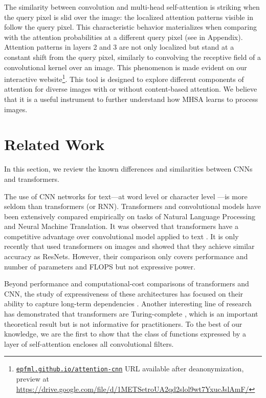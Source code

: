 \documentclass{article} \usepackage{iclr2020_conference,times}
\newcommand{\interactiveurl}{\href{https://epfml.github.io/attention-cnn}{\tt epfml.github.io/attention-cnn}}
\begin{document}
The similarity between convolution and multi-head self-attention is striking when the query pixel is slid over the image:
the localized attention patterns visible in  follow the query pixel.
This characteristic behavior materializes when comparing  with the attention probabilities at a different query pixel (see  in Appendix).
Attention patterns in layers 2 and 3 are not only localized but stand at a constant shift from the query pixel, similarly to convolving the receptive field of a convolutional kernel over an image.
This phenomenon is made evident on our interactive website\footnote{\ificlrfinal \interactiveurl{} \else URL available after deanonymization, preview at \url{https://drive.google.com/file/d/1METSetroUA2qd2slol9wt7YxucJslAmF/} \fi}.
This tool is designed to explore different components of attention for diverse images with or without content-based attention.
We believe that it is a useful instrument to further understand how MHSA learns to process images.

\section{Related Work}

In this section, we review the known differences and similarities between CNNs and transformers.



The use of CNN networks for text---at word level \citep{DBLP:journals/corr/GehringAGYD17} or character level \citep{kim-2014-convolutional}---is more seldom than transformers (or RNN).
Transformers and convolutional models have been extensively compared empirically on tasks of Natural Language Processing and Neural Machine Translation.
It was observed that transformers have a competitive advantage over convolutional model applied to text \citep{vaswani17attentionisallyouneed}.
It is only recently that \cite{belloAttentionAugmentedConvolutional2019,ramachandran2019standaloneselfattention} used transformers on images and showed that they achieve similar accuracy as ResNets.
However, their comparison only covers performance and number of parameters and FLOPS but not expressive power.



Beyond performance and computational-cost comparisons of transformers and CNN, the study of expressiveness of these architectures has focused on their ability to capture long-term dependencies \citep{dai2019transformerxl}.
Another interesting line of research has demonstrated that transformers are Turing-complete \citep{universalTransformers,perez2019turingcomplete}, which is an important theoretical result but is not informative for practitioners.
To the best of our knowledge, we are the first to show that the class of functions expressed by a layer of self-attention encloses all convolutional filters.
\end{document}
